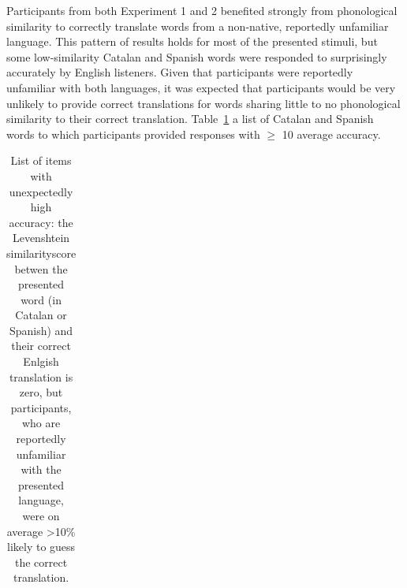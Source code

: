\documentclass[
]{article}
\begin{document}
Participants from both Experiment 1 and 2 benefited strongly from
phonological similarity to correctly translate words from a non-native,
reportedly unfamiliar language. This pattern of results holds for most
of the presented stimuli, but some low-similarity Catalan and Spanish
words were responded to surprisingly accurately by English listeners.
Given that participants were reportedly unfamiliar with both languages,
it was expected that participants would be very unlikely to provide
correct translations for words sharing little to no phonological
similarity to their correct translation. Table~\ref{tbl-surprises} a
list of Catalan and Spanish words to which participants provided
responses with \(\geq\) 10 average accuracy.

\begin{longtable}{l|rr}

\caption{\label{tbl-surprises}List of items with unexpectedly high
accuracy: the Levenshtein similarityscore betwen the presented word (in
Catalan or Spanish) and their correct Enlgish translation is zero, but
participants, who are reportedly unfamiliar with the presented language,
were on average \textgreater10\% likely to guess the correct
translation.}

\tabularnewline


\end{longtable}
\end{document}
